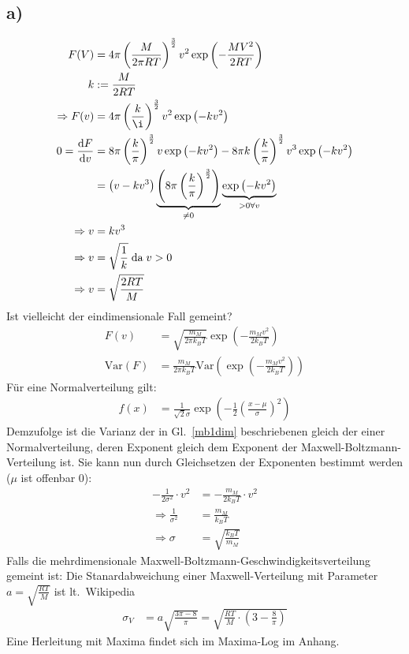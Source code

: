 \documentclass[12pt,a4paper,notitlepage]{article}
\newcommand{\diff}{\mathrm{d}}
\begin{document}
\subsection*{a)}
\begin{align}
F(V)&=4\pi\left(\frac{M}{2\pi RT}\right)^{\frac{3}{2}}v^2\exp\left(-\frac{MV^2}{2RT}\right)\\
k&:=\frac{M}{2RT}\\
\Rightarrow F(v)&=4\pi\left(\frac{k}{\i}\right)^\frac{3}{2}v^2\exp\left(-kv^2\right)\\
0=\frac{\diff F}{\diff v}&=8\pi\left(\frac{k}{\pi}\right)^\frac{3}{2}v\exp\left(-kv^2\right)-8\pi k\left(\frac{k}{\pi}\right)^\frac{3}{2}v^3\exp\left(-kv^2\right)\\
&=\left(v-kv^3\right)\underbrace{\left(8\pi\left(\frac{k}{\pi}\right)^\frac{3}{2}\right)}_{\neq 0}\underbrace{\exp\left(-kv^2\right)}_{>0\forall v}\\
\Rightarrow v&=kv^3\\
\Rightarrow v&=\sqrt{\frac{1}{k}}\;\text{da}\;v>0\\
\Rightarrow v&=\sqrt{\frac{2RT}{M}}
\end{align}
Ist vielleicht der eindimensionale Fall gemeint?
\begin{align}
F(v)&=\sqrt{\frac{m_M}{2\pi k_BT}}\exp\left(-\frac{m_Mv^2}{2k_BT}\right)\label{mb1dim}\\
\mathrm{Var}(F)&=\frac{m_M}{2\pi k_BT}\mathrm{Var}\left(\exp\left(-\frac{m_Mv^2}{2k_BT}\right)\right)
\end{align}
Für eine Normalverteilung gilt:
\begin{align}
f(x)&=\frac{1}{\sqrt{2}\sigma}\exp\left(-\frac{1}{2}\left(\frac{x-\mu}{\sigma}\right)^2\right)
\end{align}
Demzufolge ist die Varianz der in Gl.\ \ref{mb1dim} beschriebenen gleich der einer Normalverteilung, deren Exponent gleich dem Exponent der Maxwell-Boltzmann-Verteilung ist. Sie kann nun durch Gleichsetzen der Exponenten bestimmt werden ($\mu$ ist offenbar 0):
\begin{align}
-\frac{1}{2\sigma^2}\cdot v^2&=-\frac{m_M}{2k_BT}\cdot v^2\\
\Rightarrow \frac{1}{\sigma^2}&=\frac{m_M}{k_BT}\\
\Rightarrow \sigma&=\sqrt{\frac{k_BT}{m_M}}
\end{align}
Falls die mehrdimensionale Maxwell-Boltzmann-Geschwindigkeitsverteilung gemeint ist: Die Stanardabweichung einer Maxwell-Verteilung mit Parameter $a=\sqrt{\frac{RT}{M}}$ ist lt.\ Wikipedia
\begin{align}
\sigma_V&=a\sqrt{\frac{3\pi-8}{\pi}}=\sqrt{\frac{RT}{M}\cdot\left(3-\frac{8}{\pi}\right)}
\end{align}
Eine Herleitung mit Maxima findet sich im Maxima-Log im Anhang.
\end{document}
